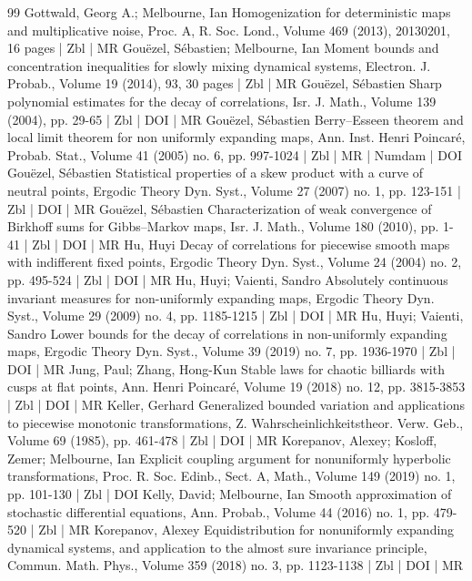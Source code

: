 \documentclass[10pt]{amsart}
\theoremstyle{definition}\newtheorem{defi}[theo]{Definition}\newtheorem{rema}[theo]{Remark}\newtheorem{exam}[theo]{Example}\newtheorem{exem}[theo]{Example}\newtheorem{nota}[theo]{Notation}
\begin{document}
\begin{thebibliography}{99}
Gottwald, Georg A.; Melbourne, Ian Homogenization for deterministic maps and multiplicative noise, Proc. A, R. Soc. Lond., Volume 469 (2013), 20130201, 16 pages | Zbl | MR
Gouëzel, Sébastien; Melbourne, Ian Moment bounds and concentration inequalities for slowly mixing dynamical systems, Electron. J. Probab., Volume 19 (2014), 93, 30 pages | Zbl | MR
Gouëzel, Sébastien Sharp polynomial estimates for the decay of correlations, Isr. J. Math., Volume 139 (2004), pp. 29-65 | Zbl | DOI | MR
Gouëzel, Sébastien Berry–Esseen theorem and local limit theorem for non uniformly expanding maps, Ann. Inst. Henri Poincaré, Probab. Stat., Volume 41 (2005) no. 6, pp. 997-1024 | Zbl | MR | Numdam | DOI
Gouëzel, Sébastien Statistical properties of a skew product with a curve of neutral points, Ergodic Theory Dyn. Syst., Volume 27 (2007) no. 1, pp. 123-151 | Zbl | DOI | MR
Gouëzel, Sébastien Characterization of weak convergence of Birkhoff sums for Gibbs–Markov maps, Isr. J. Math., Volume 180 (2010), pp. 1-41 | Zbl | DOI | MR
Hu, Huyi Decay of correlations for piecewise smooth maps with indifferent fixed points, Ergodic Theory Dyn. Syst., Volume 24 (2004) no. 2, pp. 495-524 | Zbl | DOI | MR
Hu, Huyi; Vaienti, Sandro Absolutely continuous invariant measures for non-uniformly expanding maps, Ergodic Theory Dyn. Syst., Volume 29 (2009) no. 4, pp. 1185-1215 | Zbl | DOI | MR
Hu, Huyi; Vaienti, Sandro Lower bounds for the decay of correlations in non-uniformly expanding maps, Ergodic Theory Dyn. Syst., Volume 39 (2019) no. 7, pp. 1936-1970 | Zbl | DOI | MR
Jung, Paul; Zhang, Hong-Kun Stable laws for chaotic billiards with cusps at flat points, Ann. Henri Poincaré, Volume 19 (2018) no. 12, pp. 3815-3853 | Zbl | DOI | MR
Keller, Gerhard Generalized bounded variation and applications to piecewise monotonic transformations, Z. Wahrscheinlichkeitstheor. Verw. Geb., Volume 69 (1985), pp. 461-478 | Zbl | DOI | MR
Korepanov, Alexey; Kosloff, Zemer; Melbourne, Ian Explicit coupling argument for nonuniformly hyperbolic transformations, Proc. R. Soc. Edinb., Sect. A, Math., Volume 149 (2019) no. 1, pp. 101-130 | Zbl | DOI
Kelly, David; Melbourne, Ian Smooth approximation of stochastic differential equations, Ann. Probab., Volume 44 (2016) no. 1, pp. 479-520 | Zbl | MR
Korepanov, Alexey Equidistribution for nonuniformly expanding dynamical systems, and application to the almost sure invariance principle, Commun. Math. Phys., Volume 359 (2018) no. 3, pp. 1123-1138 | Zbl | DOI | MR

\end{thebibliography}
\end{document}
